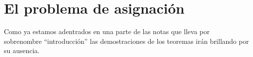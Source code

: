 \chapter{El problema de asignación}
\label{asig}
Como ya estamos adentrados en una parte de las notas que lleva por sobrenombre ``introducción'' las demostraciones de los teoremas irán brillando por su ausencia.